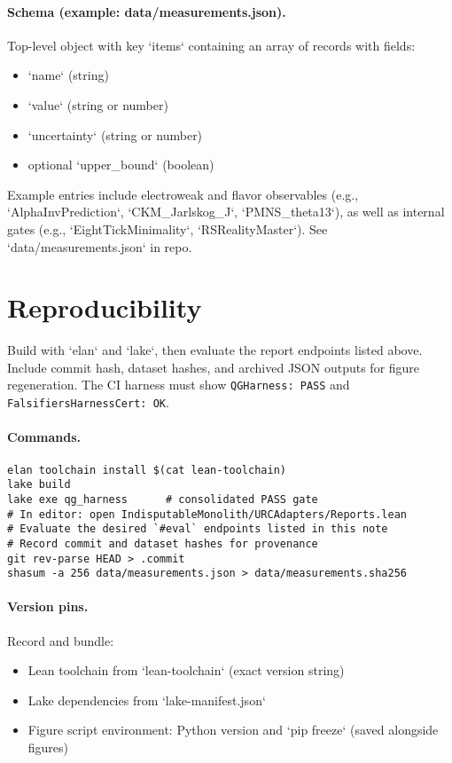 \documentclass[11pt]{article}
\begin{document}
\paragraph{Schema (example: data/measurements.json).}
Top-level object with key `items` containing an array of records with fields:
\begin{itemize}
  \item `name` (string)
  \item `value` (string or number)
  \item `uncertainty` (string or number)
  \item optional `upper_bound` (boolean)
\end{itemize}
Example entries include electroweak and flavor observables (e.g., `AlphaInvPrediction`, `CKM_Jarlskog_J`, `PMNS_theta13`), as well as internal gates (e.g., `EightTickMinimality`, `RSRealityMaster`). See `data/measurements.json` in repo.

\section{Reproducibility}
Build with `elan` and `lake`, then evaluate the report endpoints listed above. Include commit hash, dataset hashes, and archived JSON outputs for figure regeneration. The CI harness must show \texttt{QGHarness: PASS} and \texttt{FalsifiersHarnessCert: OK}.
\paragraph{Commands.}
\begin{verbatim}
elan toolchain install $(cat lean-toolchain)
lake build
lake exe qg_harness      # consolidated PASS gate
# In editor: open IndisputableMonolith/URCAdapters/Reports.lean
# Evaluate the desired `#eval` endpoints listed in this note
# Record commit and dataset hashes for provenance
git rev-parse HEAD > .commit
shasum -a 256 data/measurements.json > data/measurements.sha256
\end{verbatim}

\paragraph{Version pins.}
Record and bundle:
\begin{itemize}
  \item Lean toolchain from `lean-toolchain` (exact version string)
  \item Lake dependencies from `lake-manifest.json`
  \item Figure script environment: Python version and `pip freeze` (saved alongside figures)
\end{itemize}
\end{document}

